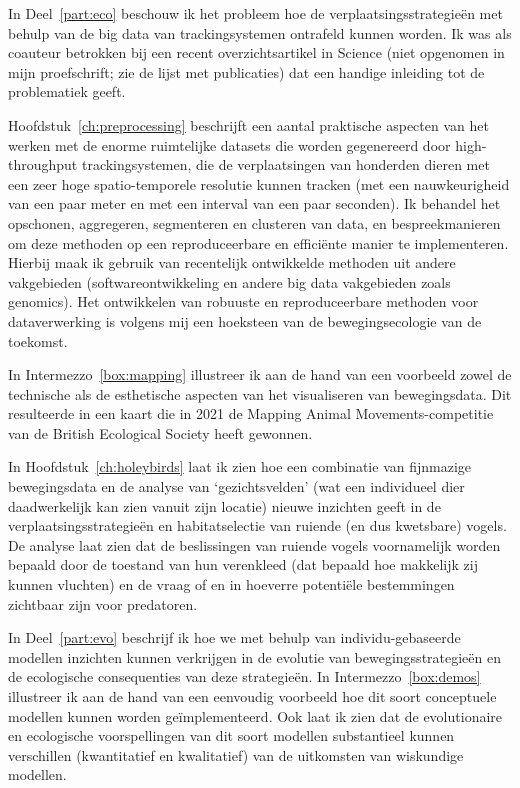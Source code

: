 In Deel~\ref{part:eco} beschouw ik het probleem hoe de verplaatsingsstrategie{\"e}n met behulp van de big data van trackingsystemen ontrafeld kunnen worden. Ik was als coauteur betrokken bij een recent overzichtsartikel in Science (niet opgenomen in mijn proefschrift; zie de lijst met publicaties) dat een handige inleiding tot de problematiek geeft.

Hoofdstuk~\ref{ch:preprocessing} beschrijft een aantal praktische aspecten van het werken met de enorme ruimtelijke datasets die worden gegenereerd door high-throughput trackingsystemen, die de verplaatsingen van honderden dieren met een zeer hoge spatio-temporele resolutie kunnen tracken (met een nauwkeurigheid van een paar meter en met een interval van een paar seconden). Ik behandel het opschonen, aggregeren, segmenteren en clusteren van data, en bespreekmanieren om deze methoden op een reproduceerbare en effici{\"e}nte manier te implementeren. Hierbij maak ik gebruik van recentelijk ontwikkelde methoden uit andere vakgebieden (softwareontwikkeling en andere big data vakgebieden zoals genomics). Het ontwikkelen van robuuste en reproduceerbare methoden voor dataverwerking is volgens mij een hoeksteen van de bewegingsecologie van de toekomst.

In Intermezzo~\ref{box:mapping} illustreer ik aan de hand van een voorbeeld zowel de technische als de esthetische aspecten van het visualiseren van bewegingsdata. Dit resulteerde in een kaart die in 2021 de Mapping Animal Movements-competitie van de British Ecological Society heeft gewonnen.

In Hoofdstuk~\ref{ch:holeybirds} laat ik zien hoe een combinatie van fijnmazige bewegingsdata en de analyse van `gezichtsvelden' (wat een individueel dier daadwerkelijk kan zien vanuit zijn locatie) nieuwe inzichten geeft in de verplaatsingsstrategie{\"e}n en habitatselectie van ruiende (en dus kwetsbare) vogels. De analyse laat zien dat de beslissingen van ruiende vogels voornamelijk worden bepaald door de toestand van hun verenkleed (dat bepaald hoe makkelijk zij kunnen vluchten) en de vraag of en in hoeverre potenti{\"e}le bestemmingen zichtbaar zijn voor predatoren.

In Deel~\ref{part:evo} beschrijf ik hoe we met behulp van individu-gebaseerde modellen inzichten kunnen verkrijgen in de evolutie van bewegingsstrategie{\"e}n en de ecologische consequenties van deze strategie{\"e}n. In Intermezzo~\ref{box:demos} illustreer ik aan de hand van een eenvoudig voorbeeld hoe dit soort conceptuele modellen kunnen worden geïmplementeerd. Ook laat ik zien dat de evolutionaire en ecologische voorspellingen van dit soort modellen substantieel kunnen verschillen (kwantitatief en kwalitatief) van de uitkomsten van wiskundige modellen.

